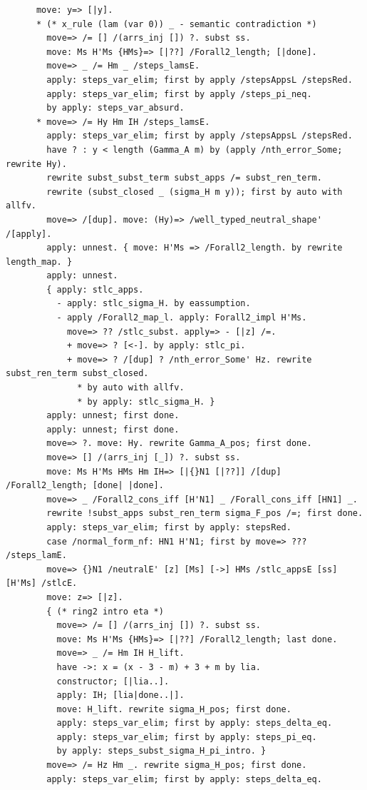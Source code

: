 \documentclass[10pt,a4paper]{amsart}
\begin{document}
\begin{lstlisting}
      move: y=> [|y].
      * (* x_rule (lam (var 0)) _ - semantic contradiction *)
        move=> /= [] /(arrs_inj []) ?. subst ss.
        move: Ms H'Ms {HMs}=> [|??] /Forall2_length; [|done].
        move=> _ /= Hm _ /steps_lamsE.
        apply: steps_var_elim; first by apply /stepsAppsL /stepsRed.
        apply: steps_var_elim; first by apply /steps_pi_neq.
        by apply: steps_var_absurd.
      * move=> /= Hy Hm IH /steps_lamsE.
        apply: steps_var_elim; first by apply /stepsAppsL /stepsRed.
        have ? : y < length (Gamma_A m) by (apply /nth_error_Some; rewrite Hy).
        rewrite subst_subst_term subst_apps /= subst_ren_term.
        rewrite (subst_closed _ (sigma_H m y)); first by auto with allfv.
        move=> /[dup]. move: (Hy)=> /well_typed_neutral_shape' /[apply].
        apply: unnest. { move: H'Ms => /Forall2_length. by rewrite length_map. }
        apply: unnest.
        { apply: stlc_apps.
          - apply: stlc_sigma_H. by eassumption.
          - apply /Forall2_map_l. apply: Forall2_impl H'Ms.
            move=> ?? /stlc_subst. apply=> - [|z] /=.
            + move=> ? [<-]. by apply: stlc_pi.
            + move=> ? /[dup] ? /nth_error_Some' Hz. rewrite subst_ren_term subst_closed.
              * by auto with allfv.
              * by apply: stlc_sigma_H. }
        apply: unnest; first done.
        apply: unnest; first done.
        move=> ?. move: Hy. rewrite Gamma_A_pos; first done.
        move=> [] /(arrs_inj [_]) ?. subst ss.
        move: Ms H'Ms HMs Hm IH=> [|{}N1 [|??]] /[dup] /Forall2_length; [done| |done].
        move=> _ /Forall2_cons_iff [H'N1] _ /Forall_cons_iff [HN1] _.
        rewrite !subst_apps subst_ren_term sigma_F_pos /=; first done.
        apply: steps_var_elim; first by apply: stepsRed.
        case /normal_form_nf: HN1 H'N1; first by move=> ??? /steps_lamE.
        move=> {}N1 /neutralE' [z] [Ms] [->] HMs /stlc_appsE [ss] [H'Ms] /stlcE.
        move: z=> [|z].
        { (* ring2 intro eta *)
          move=> /= [] /(arrs_inj []) ?. subst ss.
          move: Ms H'Ms {HMs}=> [|??] /Forall2_length; last done.
          move=> _ /= Hm IH H_lift. 
          have ->: x = (x - 3 - m) + 3 + m by lia.
          constructor; [|lia..].
          apply: IH; [lia|done..|].
          move: H_lift. rewrite sigma_H_pos; first done.
          apply: steps_var_elim; first by apply: steps_delta_eq.
          apply: steps_var_elim; first by apply: steps_pi_eq.
          by apply: steps_subst_sigma_H_pi_intro. }
        move=> /= Hz Hm _. rewrite sigma_H_pos; first done.
        apply: steps_var_elim; first by apply: steps_delta_eq.

\end{lstlisting}
\end{document}
